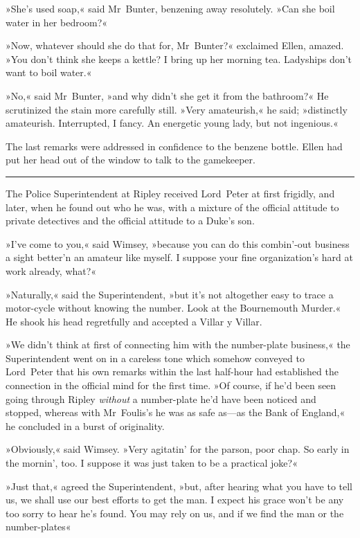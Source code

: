 »She's used soap,« said Mr~Bunter, benzening away resolutely. »Can she boil water in her bedroom?«

»Now, whatever should she do that for, Mr~Bunter?« exclaimed Ellen, amazed. »You don't think she keeps a kettle? I bring up her morning tea. Ladyships don't want to boil water.«

»No,« said Mr~Bunter, »and why didn't she get it from the bathroom?« He scrutinized the stain more carefully still. »Very amateurish,« he said; »distinctly amateurish. Interrupted, I fancy. An energetic young lady, but not ingenious.«

The last remarks were addressed in confidence to the benzene bottle.  Ellen had put her head out of the window to talk to the gamekeeper.

\noindent\hfil\rule{0.5\textwidth}{.4pt}\hfil

The Police Superintendent at Ripley received Lord~Peter at first frigidly, and later, when he found out who he was, with a mixture of the official attitude to private detectives and the official attitude to a Duke's son.

»I've come to you,« said Wimsey, »because you can do this combin'-out business a sight better'n an amateur like myself. I suppose your fine organization's hard at work already, what?«

»Naturally,« said the Superintendent, »but it's not altogether easy to trace a motor-cycle without knowing the number. Look at the Bournemouth Murder.« He shook his head regretfully and accepted a Villar y Villar.

»We didn't think at first of connecting him with the number-plate business,« the Superintendent went on in a careless tone which somehow conveyed to Lord~Peter that his own remarks within the last half-hour had established the connection in the official mind for the first time. »Of course, if he'd been seen going through Ripley \textit{without} a number-plate he'd have been noticed and stopped, whereas with Mr~Foulis's he was as safe as—as the Bank of England,« he concluded in a burst of originality.

»Obviously,« said Wimsey. »Very agitatin' for the parson, poor chap.  So early in the mornin', too. I suppose it was just taken to be a practical joke?«

»Just that,« agreed the Superintendent, »but, after hearing what you have to tell us, we shall use our best efforts to get the man. I expect his grace won't be any too sorry to hear he's found. You may rely on us, and if we find the man or the number-plates\longdash«

